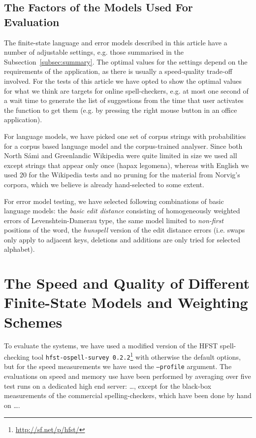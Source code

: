 \documentclass[a4paper,12pt]{article}
\begin{document}
\subsection{The Factors of the Models Used For Evaluation}
\label{subsec:factors}

The finite-state language and error models described in this article have a
number of adjustable settings, e.g. those summarised in the
Subsection~\ref{subsec:summary}. The optimal values for the settings depend on
the requirements of the application, as there is usually a speed-quality
trade-off involved. For the tests of this article we have opted to show the
optimal values for what we think are targets for online spell-checkers, e.g. at
most one second of a wait time to generate the list of suggestions from the
time that user activates the function to get them (e.g. by pressing the right
mouse button in an office application).

For language models, we have picked one set of corpus strings with
probabilities for a corpus based language model and the corpus-trained
analyser. Since both North Sámi and Greenlandic Wikipedia were quite limited in
size we used all except strings that appear only once (hapax legomena), whereas
with English we used 20 for the Wikipedia tests and no pruning for the material
from Norvig's corpora, which we believe is already hand-selected to some
extent.

For error model testing, we have selected following combinations of basic
language models: the \emph{basic edit distance} consisting of homogeneously
weighted errors of Levenshtein-Damerau type, the same model limited to
\emph{non-first} positions of the word, the \emph{hunspell} version of the edit
distance errors (i.e. swaps only apply to adjacent keys, deletions and
additions are only tried for selected alphabet).


\section{The Speed and Quality of Different Finite-State Models and Weighting
Schemes}
\label{sec:evaluation}

To evaluate the systems, we have used a modified version of the HFST
spell-checking tool \texttt{hfst-ospell-survey
0.2.2}\footnote{\url{http://sf.net/p/hfst/}} with otherwise the default
options, but for the speed measurements we have used the \texttt{--profile}
argument.  The evaluations on speed and memory use have been performed by
averaging over five test runs on a dedicated high end server: \ldots, except
for the black-box measurements of the commercial spelling-checkers, which have
been done by hand on \ldots.
\end{document}
